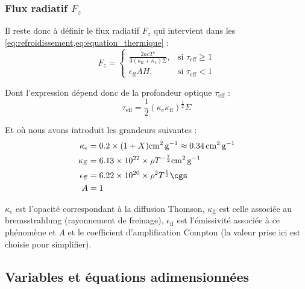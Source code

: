 \subsubsection{\texorpdfstring{Flux radiatif $F_z$}{Flux radiatif Fz}}

Il reste donc à définir le flux radiatif $F_z$ qui intervient dans les
\cref{eq:refroidissement,eq:equation_thermique} :
\begin{equation}
    \label{eq:flux}
    F_z =
    \begin{cases}
        \frac{2 a c T^4}{3 (\kappa_\mathrm{ff} + \kappa_e)\Sigma}, &\text{si $\tau_\mathrm{eff} \geq 1$} \\
        \epsilon_\mathrm{ff} A H, &\text{si $\tau_\mathrm{eff} < 1$}
    \end{cases}
\end{equation}

Dont l’expression dépend donc de la profondeur optique $\tau_\mathrm{eff}$ :
\begin{equation}
    \label{eq:tau_eff}
    \tau_\mathrm{eff} = \frac{1}{2} (\kappa_e \kappa_\mathrm{ff})^\frac{1}{2} \Sigma
\end{equation}

Et où nous avons introduit les grandeurs suivantes :
\begin{subequations}
    \begin{align}
        \label{eq:opacite_thomson}
        \kappa_e &= 0.2 \times (1 + X) \si{\square\centi\meter\per\gram} \approx \SI{0.34}{\square\centi\meter\per\gram} \\
        \label{eq:opacite_bremsstrahlung}
        \kappa_\mathrm{ff} &= \num{6.13e22} \times \rho T^{-\frac{7}{2}} \si{\square\centi\meter\per\gram}\\
        \label{eq:emissivite}
        \epsilon_\mathrm{ff} &= \num{6.22e20} \times \rho^2 T^\frac{1}{2} \si{\cgs} \\
        A &= 1
    \end{align}
\end{subequations}

$\kappa_e$ est l’opacité correspondant à la diffusion Thomson,
$\kappa_\mathrm{ff}$ est celle associée au bremsstrahlung (rayonnement de
freinage), $\epsilon_\mathrm{ff}$ est l’émissivité associée à ce phénomène et
$A$ et le coefficient d’amplification Compton (la valeur prise ici est choisie
pour simplifier).

\subsection{Variables et équations adimensionnées}

